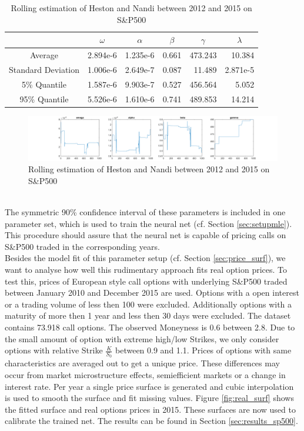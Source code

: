 \documentclass{article}
\begin{document}
\begin{table}[!ht]
\centering
\begin{tabular}{|c|r|r|r|r|r|}
\hline
 & \multicolumn{1}{c|}{$\omega$} & \multicolumn{1}{c|}{$\alpha$} & \multicolumn{1}{c|}{$\beta$} & \multicolumn{1}{c|}{$\gamma$} & \multicolumn{1}{c|}{$\lambda$} \\ \hline
Average & 2.894e-6 & 1.235e-6 & 0.661 & 473.243 & 10.384 \\ \hline
Standard Deviation & 1.006e-6 & 2.649e-7 & 0.087 & 11.489 & 2.871e-5 \\ \hline
5\% Quantile & 1.587e-6 & 9.903e-7 & 0.527 & 456.564 & 5.052 \\ \hline
95\% Quantile & 5.526e-6 & 1.610e-6 & 0.741 & 489.853 & 14.214 \\\hline
\end{tabular}\label{tab:resultsMLE}\vspace{0.1cm}
\caption{Rolling estimation of Heston and Nandi between 2012 and 2015 on S\&P500}
\end{table}
\begin{figure}[!ht]
    \centering
    \includegraphics[width=\linewidth]{parameter_mle.png}
    \caption{Rolling estimation of Heston and Nandi between 2012 and 2015 on S\&P500}
    \label{fig:paramsMLE}
\end{figure}\\
The  symmetric 90\% confidence interval of these parameters is included in one parameter set, which is used to train the neural net (cf. Section \ref{sec:setupmle}). This procedure should assure that the neural net is capable of pricing calls on S\&P500 traded in the corresponding years.\\
Besides the model fit of this parameter setup (cf. Section \ref{sec:price_surf}), we want to analyse how well this rudimentary approach fits real option prices. To test this, prices of European style call options with underlying S\&P500 traded between January 2010 and December 2015 are used. Options with a open interest or a trading volume of less then 100 were excluded. Additionally options with a maturity of more then 1 year and less then 30 days were excluded. The dataset contains 73.918 call options. The observed Moneyness is 0.6 between 2.8. Due to the small amount of option with extreme high/low Strikes, we only consider options with relative Strike $\frac{K}{S_0}$ between 0.9 and 1.1. Prices of options with same characteristics are averaged out to get a unique price. These differences may occur from market microstructure effects, semiefficient markets or a change in interest rate. Per year a single price surface is generated and cubic interpolation is used to smooth the surface and fit missing values. Figure \ref{fig:real_surf} shows the fitted surface and real options prices in 2015. These surfaces are now used to calibrate the trained net. The results can be found in Section \ref{sec:results_sp500}.
\end{document}
